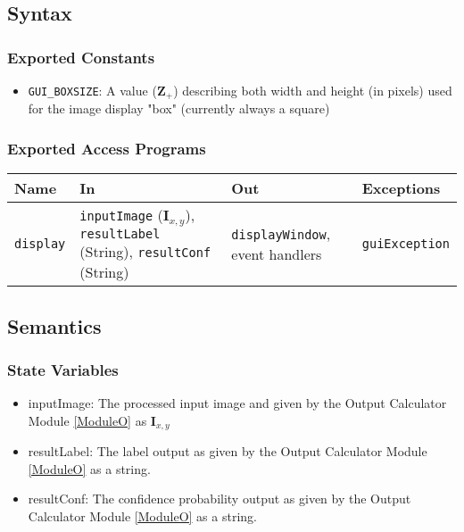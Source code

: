 \documentclass[12pt, titlepage]{article}
\def\code#1{\texttt{#1}}
\begin{document}
\subsection{Syntax}

\subsubsection{Exported Constants}

\begin{itemize}
  \item \code{GUI\_BOXSIZE}: A value ($\mathbf{Z}_{+}$) describing both width and height (in pixels) used for the image
  display "box" (currently always a square)
\end{itemize}

\subsubsection{Exported Access Programs}

\begin{center}
\begin{tabular}{p{2cm} p{4cm} p{4cm} p{2cm}}
\hline
\textbf{Name} & \textbf{In} & \textbf{Out} & \textbf{Exceptions} \\
\hline
\code{display} & \code{inputImage} ($\mathbf{I}_{x,y}$), \code{resultLabel} (String), \code{resultConf} (String) & \code{displayWindow}, event handlers & \code{guiException} \\
\hline
\end{tabular}
\end{center}

\subsection{Semantics}

\subsubsection{State Variables}

\begin{itemize}
  \item inputImage: The processed input image and given by the Output Calculator Module \ref{ModuleO} as $\mathbf{I}_{x,y}$
  \item resultLabel: The label output as given by the Output Calculator Module \ref{ModuleO} as a string.
  \item resultConf: The confidence probability output as given by the Output Calculator Module \ref{ModuleO} as a string.
\end{itemize}
\end{document}
